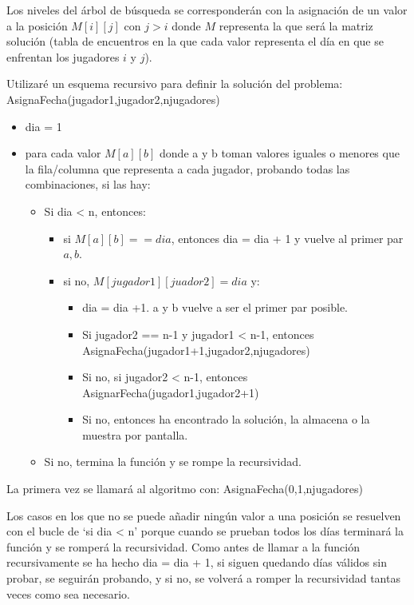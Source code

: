 \documentclass[a4paper, 11pt]{article}
\begin{document}
Los niveles del árbol de búsqueda se corresponderán con la asignación de un valor a la posición $M[i][j]$ con $j>i$ donde $M$ representa la que será la matriz solución (tabla de encuentros en la que cada valor representa el día en que se enfrentan los jugadores $i$ y $j$).

Utilizaré un esquema recursivo para definir la solución del problema:
\pagebreak
AsignaFecha(jugador1,jugador2,njugadores)
\begin{itemize}
	\item dia = 1
	\item para cada valor $M[a][b]$ donde a y b toman valores iguales o menores que la fila/columna que representa a cada jugador, probando todas las combinaciones, si las hay: 
	\begin{itemize}
		\item Si dia < n, entonces: 
			\begin{itemize}
			\item si $M[a][b]==dia$, entonces dia = dia + 1 y vuelve al primer par $a,b$.
			\item si no, $M[jugador1][juador2] = dia $ y:
				\begin{itemize}
				\item dia = dia +1. a y b vuelve a ser el primer par posible.
				\item Si jugador2 == n-1 y jugador1 < n-1, entonces AsignaFecha(jugador1+1,jugador2,njugadores)
				\item Si no, si jugador2 < n-1, entonces AsignarFecha(jugador1,jugador2+1)
				\item Si no, entonces ha encontrado la solución, la almacena o la muestra por pantalla.
				\end{itemize}
			\end{itemize}	
		\item Si no, termina la función y se rompe la recursividad.
	\end{itemize}
\end{itemize}

La primera vez se llamará al algoritmo con: AsignaFecha(0,1,njugadores)

Los casos en los que no se puede añadir ningún valor a una posición se resuelven con el bucle de `si dia < n' porque cuando se prueban todos los días terminará la función y se romperá la recursividad. Como antes de llamar a la función recursivamente se ha hecho dia = dia + 1, si siguen quedando días válidos sin probar, se seguirán probando, y si no, se volverá a romper la recursividad tantas veces como sea necesario.
\end{document}
